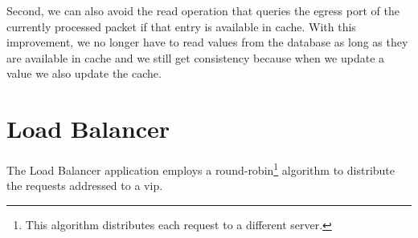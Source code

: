 Second, we can also avoid the read operation that queries the egress port of the currently processed packet if that entry is  available in cache. 
With this improvement, we no longer have to read values from the database as long as they are available in cache and we still get consistency because when we update a value we also update the cache. 





\section{Load Balancer}
\label{sec:feasibility:lb}
\glsresetall
The Load Balancer application employs a round-robin\footnote{This algorithm distributes each request to a different server.} algorithm to distribute the requests addressed to a \gls{vip}.

